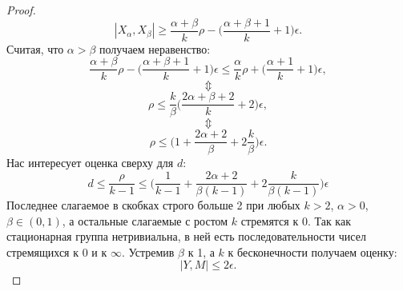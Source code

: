 \begin{proof}
	$$|X_\alpha, X_{\beta}| \ge \frac{\alpha+\beta}{k}\rho - \big(\frac{\alpha+\beta+1}{k}+1\big)\epsilon.$$
	 Считая, что $\alpha > \beta$ получаем неравенство:
	 $$\frac{\alpha+\beta}{k}\rho - \big(\frac{\alpha+\beta+1}{k}+1\big)\epsilon \le \frac{\alpha}{k}\rho + \big(\frac{\alpha+1}{k} + 1\big)\epsilon,$$
	 $$\Updownarrow$$
	 $$\rho \le \frac{k}{\beta}\bigg(\frac{2\alpha+\beta+2}{k}+2\bigg)\epsilon,$$
	 $$\Updownarrow$$
	 $$\rho \le \bigg(1+\frac{2\alpha + 2}{\beta} + 2\frac{k}{\beta}\bigg)\epsilon.$$
	Нас интересует оценка сверху для $d$:
	$$d \le \frac{\rho}{k-1} \le \bigg(\frac{1}{k-1}+\frac{2\alpha + 2}{\beta(k-1)} + 2\frac{k}{\beta(k-1)}\bigg)\epsilon $$
	Последнее слагаемое в скобках строго больше 2 при любых $k>2$, $\alpha>0$,
$\beta\in (0,1)$, а остальные слагаемые с ростом $k$ стремятся к $0$. Так как стационарная группа нетривиальна, в ней есть последовательности чисел стремящихся к 0 и к $\infty$.
Устремив $\beta$ к 1, а $k$ к бесконечности получаем оценку:
	$$|Y, M| \le 2\epsilon.$$

\end{proof}
